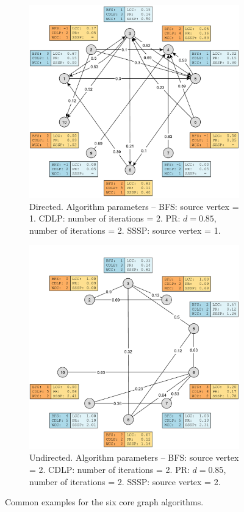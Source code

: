 \begin{figure}[h]
	\centering
	\begin{subfigure}{\textwidth}
		\centering
		\includegraphics[scale=\examplescale]{figures/examples/common-dir.pdf}
		\caption{Directed. Algorithm parameters --
			BFS: source vertex = 1.
			CDLP: number of iterations = 2.
			PR: $d = 0.85$, number of iterations = 2.
			SSSP: source vertex = 1.}
	\end{subfigure}
	\begin{subfigure}{\textwidth}
		\centering
		\includegraphics[scale=\examplescale]{figures/examples/common-undir.pdf}
		\caption{Undirected. Algorithm parameters --
			BFS: source vertex = 2.
			CDLP: number of iterations = 2.
			PR: $d = 0.85$, number of iterations = 2.
			SSSP: source vertex = 2.}
	\end{subfigure}
	\caption{Common examples for the six core graph algorithms.}
	\label{fig:common_example}
\end{figure}

